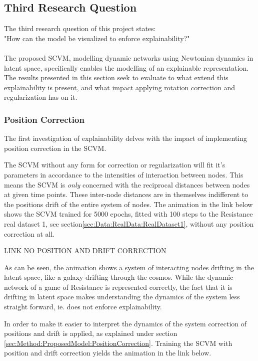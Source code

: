 \subsection{Third Research Question}
\label{sec:ResearchQuestion3}
The third research question of this project states:
\\
"How can the model be visualized to enforce explainability?"
\\\\
The proposed SCVM, modelling dynamic networks using Newtonian dynamics in latent space, specifically enables the modelling of an explainable representation.
The results presented in this section seek to evaluate to what extend this explainability is present, and what impact applying rotation correction and regularization has on it.


\subsubsection{Position Correction}
\label{sec:ResearchQuestion3:PositionCorrection}
The first investigation of explainability delves with the impact of implementing position correction in the SCVM.

The SCVM without any form for correction or regularization will fit it's parameters in accordance to the intensities of interaction between nodes.
This means the SCVM is \textit{only} concerned with the reciprocal distances between nodes at given time points.
These inter-node distances are in themselves indifferent to the positions drift of the entire system of nodes.
The animation in the link below shows the SCVM trained for 5000 epochs, fitted with 100 steps to the Resistance real dataset 1, see section\ref{sec:Data:RealData:RealDataset1}, without any position correction at all.

LINK NO POSITION AND DRIFT CORRECTION

As can be seen, the animation shows a system of interacting nodes drifting in the latent space, like a galaxy drifting through the cosmos. 
While the dynamic network of a game of Resistance is represented correctly, the fact that it is drifting in latent space makes understanding the dynamics of the system less straight forward, ie. does not enforce explainability.

In order to make it easier to interpret the dynamics of the system correction of positions and drift is applied, as explained under section \ref{sec:Method:ProposedModel:PositionCorrection}.
Training the SCVM with position and drift correction yields the animation in the link below.

